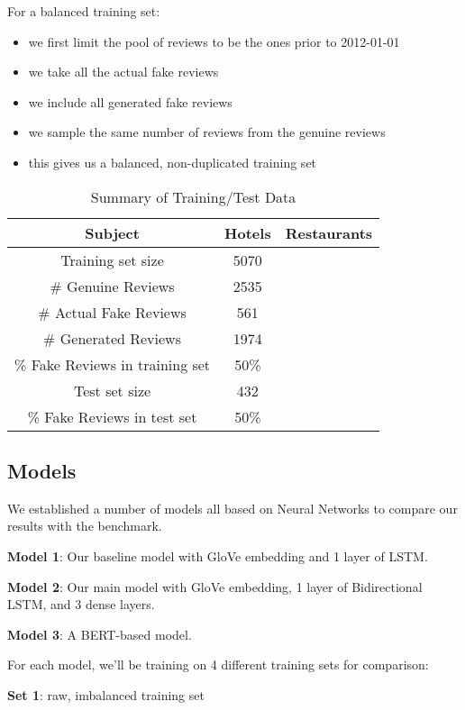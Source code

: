 \documentclass[conference, 11pt]{IEEEtran} %
\theoremstyle{plain}
\theoremstyle{definition}
\begin{document}
For a balanced training set:
\begin{itemize}
\setlength\itemsep{0em}
\item we first limit the pool of reviews to be the ones prior to 2012-01-01
\item we take all the actual fake reviews
\item we include all generated fake reviews
\item we sample the same number of reviews from the genuine reviews
\item this gives us a balanced, non-duplicated training set
\end{itemize}


\begin{table}[h!]
\small
\caption{Summary of Training/Test Data}
\centering
\begin{tabular}{|c|c|c|}
\hline
Subject & Hotels & Restaurants \\ \hline
Training set size & 5070 &  \\ \hline
\# Genuine Reviews & 2535  &  \\ \hline
\# Actual Fake Reviews & 561  &  \\ \hline
\# Generated Reviews & 1974 &  \\ \hline
\% Fake Reviews in training set & 50\% &  \\ \hline
Test set size & 432 &  \\ \hline
\% Fake Reviews in test set & 50\% &  \\ 
\hline
\end{tabular}
\label{trainining-data}

\end{table}

\subsection{Models}
We established a number of models all based on Neural Networks to compare our results with the benchmark.

\textbf{Model 1}: Our baseline model with GloVe embedding and 1 layer of LSTM.

\textbf{Model 2}: Our main model with GloVe embedding, 1 layer of Bidirectional LSTM, and 3 dense layers.

\textbf{Model 3}: A BERT-based model.

For each model, we'll be training on 4 different training sets for comparison:

 \textbf{Set 1}: raw, imbalanced training set
 
\end{document}
